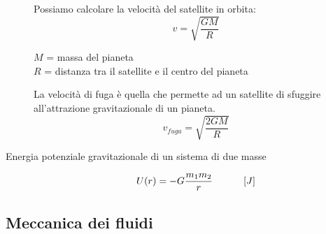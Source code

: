 \documentclass[a4paper,11pt,italian]{article}
\begin{document}
\begin{description}
  Possiamo calcolare la velocità del satellite in orbita:
  \[ v = \sqrt{\frac{GM}{R}} \]
  \begin{multicols}{2}
  $ M $ = massa del pianeta\\
  $ R $ = distanza tra il satellite e il centro del pianeta
  \end{multicols}
  
  La velocità di fuga è quella che permette ad un satellite di sfuggire all'attrazione gravitazionale di un pianeta.
  \[ v_{fuga} = \sqrt{\frac{2GM}{R}} \]
  
  \item[Energia potenziale gravitazionale di un sistema di due masse] 
  \[ U(r) = - G \frac{m_1m_2}{r} \hspace*{3em} \left[ J \right] \]
\end{description}


\subsection{Meccanica dei fluidi}
\end{document}
